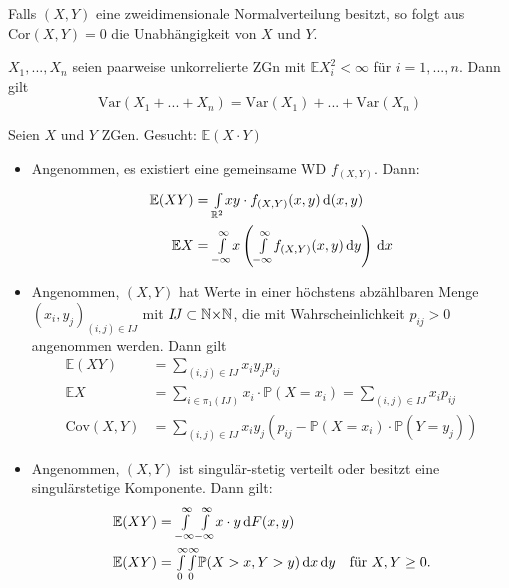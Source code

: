 \documentclass{cheat-sheet}
\renewcommand{\P}{\mathbb{P}} %
\newcommand{\E}{\mathbb{E}} %
\newcommand{\Var}{\mathrm{Var}} %
\newcommand{\Cov}{\mathrm{Cov}} %
\newcommand{\cor}{\mathrm{Cor}} %
\begin{document}
\begin{bem}
 Falls $(X, Y)$ eine zweidimensionale Normalverteilung besitzt, so folgt aus $\cor(X, Y) = 0$ die Unabhängigkeit von $X$ und $Y$.
\end{bem}

\begin{satz}
  $X_1, ..., X_n$ seien paarweise unkorrelierte ZGn mit $\E X_i^2 < \infty$ für $i = 1, ..., n$. Dann gilt
  \[ \Var(X_1 + ... + X_n) = \Var(X_1) + ... + \Var(X_n) \]
\end{satz}




\begin{bem}
  Seien $X$ und $Y$ ZGen. Gesucht: $\E (X \cdot Y)$
  \begin{itemize}
    \item Angenommen, es existiert eine gemeinsame WD $f_{(X, Y)}$. Dann:
    \begin{align*}
      \E (XY) &= \Int{\R^2}{}{x y \cdot f_{(X,Y)}(x,y)}{(x, y)} \\
      \E X &= \Int{-\infty}{\infty}{x \left(\Int{-\infty}{\infty}{f_{(X, Y)}(x,y)}{y}\right)}{x}
    \end{align*}
    \item Angenommen, $(X, Y)$ hat Werte in einer höchstens abzählbaren Menge $(x_i, y_j)_{(i,j) \in I\!J}$ mit $I\!J \subset \mathbb{N} {\times} \mathbb{N}$, die mit Wahrscheinlichkeit $p_{ij} > 0$ angenommen werden. Dann gilt
    \begin{align*}
      \E (XY) &= \sum_{(i,j) \in I\!J} x_i y_j p_{ij} \\
      \E X &= \sum_{i \in \pi_1(I\!J)} x_i \cdot \P(X{=}x_i) = \sum_{(i,j) \in I\!J} x_i p_{ij} \\
      \Cov(X, Y) &= \sum_{(i,j) \in I\!J} x_i y_j \left( p_{ij} - \P(X{=}x_i) \cdot \P(Y{=}y_j) \right)
    \end{align*}
    \item Angenommen, $(X, Y)$ ist singulär-stetig verteilt oder besitzt eine singulärstetige Komponente. Dann gilt:
    \begin{align*}
      \E (XY) &= \myint{-\infty}{\infty} \Int{-\infty}{\infty}{x \cdot y}{F(x, y)} \\
      \E (XY) &= \Int{0}{\infty}{\Int{0}{\infty}{\P(X > x, Y > y)}{x}}{y} \quad \text{für $X, Y \geq 0$.}
    \end{align*}
  \end{itemize}
\end{bem}
\end{document}
